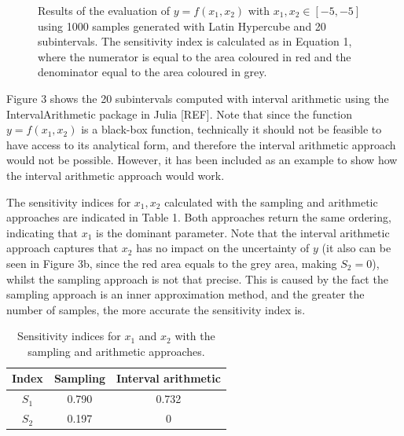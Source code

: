 \documentclass[twocolumn]{rps-esrel2022}
\begin{document}
\begin{figure}
	\caption{Results of the evaluation of $y=f(x_1,x_2)$ with $x_1,x_2 \in [-5,-5]$ using 1000 samples generated with Latin Hypercube and 20 subintervals.
	The sensitivity index is calculated as in Equation 1, where the numerator is equal to the area coloured in red and the denominator
	equal to the area coloured in grey.}
	\label{fig:myfig}
\end{figure}

Figure 3 shows the 20 subintervals computed with interval arithmetic using the IntervalArithmetic package in Julia [REF].
Note that since the function $y = f(x_1,x_2)$ is a black-box function, technically it should not be feasible to have access to
its analytical form, and therefore the interval arithmetic approach would not be possible.
However, it has been included as an example to show how the interval arithmetic approach would work.

The sensitivity indices for $x_1,x_2$ calculated with the sampling and arithmetic approaches are indicated in Table 1.
Both approaches return the same ordering, indicating that $x_1$ is the dominant parameter.
Note that the interval arithmetic approach captures that $x_2$ has no impact on the uncertainty of $y$ (it also can be seen in Figure 3b, since the
red area equals to the grey area, making $S_2 = 0$), whilst the sampling approach is not that precise.
This is caused by the fact the sampling approach is an inner approximation method, and the greater the number of samples,
the more accurate the sensitivity index is.

\begin{table}[!h]
	\centering
	\caption{Sensitivity indices for $x_1$ and $x_2$ with the sampling and arithmetic approaches.}
	\label{tab:my-table}
	\begin{tabular}{ccc}
	\hline
	Index & Sampling & Interval arithmetic \\ \hline
	$S_1$ & 0.790    & 0.732               \\
	$S_2$ & 0.197    & 0                   \\ \hline
	\end{tabular}%
\end{table}
\end{document}
